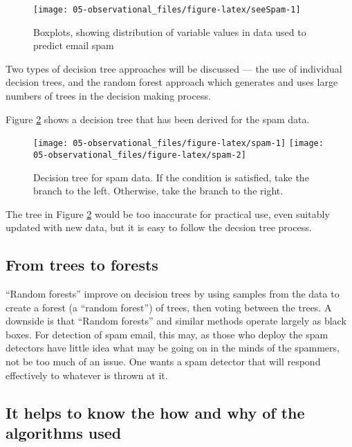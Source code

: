 \documentclass[
  10ptls,
  b5paper]{book}
\begin{document}
\begin{figure}[H]

{\centering \texttt{[image: 05-observational\_files/figure-latex/seeSpam-1]} 

}

\caption{Boxplots, showing distribution of variable values
               in data used to predict email spam}\label{fig:seeSpam}
\end{figure}

Two types of decision tree approaches will be discussed --- the use of individual decision trees, and the random forest approach which generates and uses large numbers of trees in the decision making process.

Figure \ref{fig:spam} shows a decision tree that has been derived for the spam data.

\begin{figure}[H]

{\centering \texttt{[image: 05-observational\_files/figure-latex/spam-1]} \texttt{[image: 05-observational\_files/figure-latex/spam-2]} 

}

\caption{Decision tree for spam data. If the condition is satisfied, take
               the branch to the left.  Otherwise, take the branch to the right.}\label{fig:spam}
\end{figure}

The tree in Figure \ref{fig:spam} would be too inaccurate for practical use, even suitably updated with new data, but it is easy to follow the decsion tree process.

\subsection*{From trees to forests}\label{from-trees-to-forests}

``Random forests'' improve on decision trees by using samples from the data to create a forest (a ``random forest'') of trees, then voting between the trees. A downside is that ``Random forests'' and similar methods operate largely as black boxes. For detection of spam email, this may, as those who deploy the spam detectors have little idea what may be going on in the minds of the spammers, not be too much of an issue. One wants a spam detector that will respond effectively to whatever is thrown at it.

\subsection*{It helps to know the how and why of the algorithms used}\label{it-helps-to-know-the-how-and-why-of-the-algorithms-used}
\end{document}
